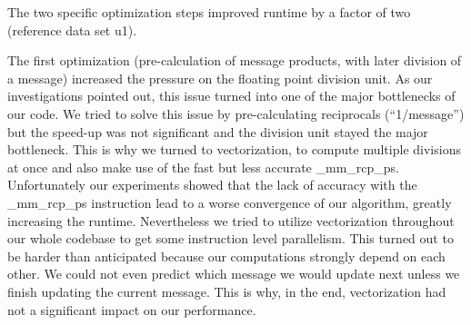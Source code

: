 The two specific optimization steps improved runtime by a factor of two (reference data set u1).

The first optimization (pre-calculation of message products, with later division of a message) increased the pressure on the floating point division unit. As our investigations pointed out, this issue turned into one of the major bottlenecks of our code. We tried to solve this issue by pre-calculating reciprocals (“1/message”) but the speed-up was not significant and the division unit stayed the major bottleneck. This is why we turned to vectorization, to compute multiple divisions at once and also make use of the fast but less accurate \_mm\_rcp\_ps. Unfortunately our experiments showed that the lack of accuracy with the \_mm\_rcp\_ps instruction lead to a worse convergence of our algorithm, greatly increasing the runtime. Nevertheless we tried to utilize vectorization throughout our whole codebase to get some instruction level parallelism. This turned out to be harder than anticipated because our computations strongly depend on each other. We could not even predict which message we would update next unless we finish updating the current message. This is why, in the end, vectorization had not a significant impact on our performance.



